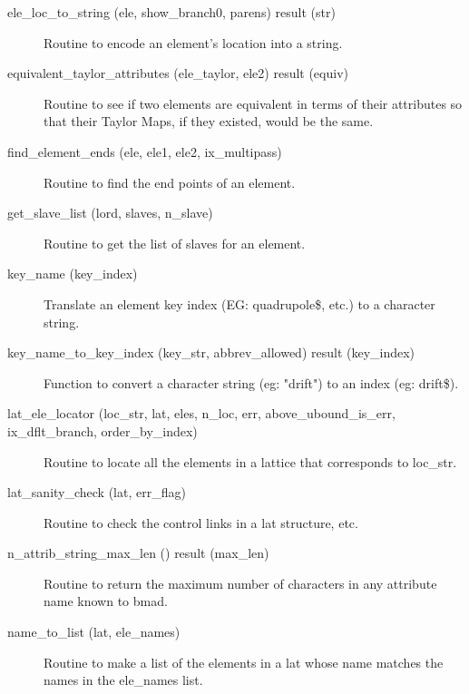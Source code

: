 \begin{description}
\label{r:ele.loc.name}
\item[ele_loc_to_string (ele, show_branch0, parens) result (str)] \Newline 
Routine to encode an element's location into a string.

\item[equivalent_taylor_attributes (ele_taylor, ele2) result (equiv)] \Newline 
Routine to see if two elements are equivalent in terms of their attributes so
that their Taylor Maps, if they existed, would be the same.

\label{r:find.element.ends}
\item[find_element_ends (ele, ele1, ele2, ix_multipass)] \Newline
Routine to find the end points of an element. 

\label{r:get.slave.list}
\item[get_slave_list (lord, slaves, n_slave)] \Newline 
Routine to get the list of slaves for an element.

\label{r:key.name}
\item[{key_name (key_index)}] \Newline
Translate an element key index (EG: quadrupole\$, etc.) to a character string.

\label{r:key.name.to.key.index}
\item[key_name_to_key_index (key_str, abbrev_allowed) result (key_index)] \Newline 
Function to convert a character string  (eg: "drift") to an index (eg: drift\$).

\label{r:lat.ele.locator}
\item[lat_ele_locator (loc_str, lat, eles, n_loc, err, 
            above_ubound_is_err, ix_dflt_branch, order_by_index)] \Newline 
Routine to locate all the elements in a lattice that corresponds to loc_str. 

\label{r:lat.sanity.check}
\item[lat_sanity_check (lat, err_flag)] \Newline
Routine to check the control links in a lat structure, etc.

\label{r:n.attrib.string.max.len}
\item[n_attrib_string_max_len () result (max_len)] \Newline 
Routine to return the maximum number of characters in any attribute
name known to bmad.

\label{r:name.to.list}
\item[name_to_list (lat, ele_names)] \Newline
Routine to make a list of the elements in a lat 
whose name matches the names in the ele_names list. 


\end{description}
